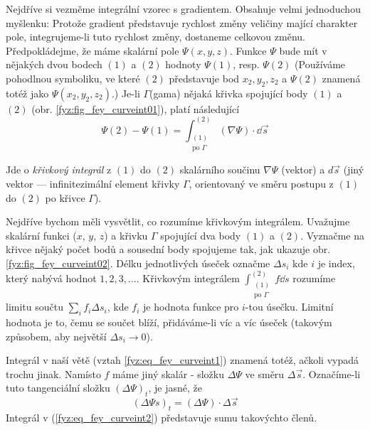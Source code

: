     Nejdříve si vezměme integrální vzorec s gradientem. Obsahuje velmi jednoduchou myšlenku: Protože 
    gradient představuje rychlost změny veličiny mající charakter pole, integrujeme-li tuto rychlost 
    změny, dostaneme celkovou změnu. Předpokládejme, že máme skalární pole \(\Psi(x, y, z)\). Funkce 
    \(\Psi\) bude mít v nějakých dvou bodech \((1)\) a \((2)\) hodnoty \(\Psi(1)\), resp. 
    \(\Psi(2)\) (Používáme pohodlnou symboliku, ve které \((2)\) představuje bod \(x_2, y_2, z_2\) a 
    \(\Psi(2)\) znamená totéž jako \(\Psi(x_2, y_2, z_2)\).) Je-li \(\Gamma\)(gama) nějaká křivka 
    spojující body \((1)\) a \((2)\) (obr. \ref{fyz:fig_fey_curveint01}), platí následující
    \begin{equation}\label{fyz:eq_fey_curveint1}
      \Psi(2)-\Psi(1) = \int_{\substack{(1)\\\text{po }\Gamma}}^{(2)}(\nabla\Psi)\cdot\dd{\vec{s}}
    \end{equation} 
    
    Jde o \emph{křivkový integrál} z \((1)\) do \((2)\) skalárního součinu \(\nabla\Psi\) (vektor) a
    \(d\vec{s}\) (jiný vektor — infinitezimální element křivky \(\Gamma\), orientovaný ve směru  
    postupu z \((1)\) do \((2)\) po křivce \(\Gamma\)).
    
    Nejdříve bychom měli vysvětlit, co rozumíme křivkovým integrálem. Uvažujme skalární funkci 
    (\(x\), \(y\), \(z\)) a křivku \(\Gamma\) spojující dva body \((1)\) a \((2)\). Vyznačme na 
    křivce nějaký počet bodů a sousední body spojujeme tak, jak ukazuje obr. 
    \ref{fyz:fig_fey_curveint02}. Délku jednotlivých úseček označme \(\Delta s_i\) kde \(i\) je 
    index, který nabývá hodnot \(1,2,3,\ldots\). Křivkovým integrálem   
    \(\displaystyle\int_{\substack{(1)\\\text{po }\Gamma}}^{(2)}f\dd{s}\) rozumíme limitu součtu 
    \(\displaystyle\sum_i f_i\Delta s_i\), kde \(f_i\) je hodnota funkce pro \(i\)-tou úsečku. 
    Limitní hodnota je to, čemu se součet blíží, přidáváme-li víc a víc úseček (takovým způsobem, 
    aby největší \(\Delta s_i\rightarrow 0\)).
    
    Integrál v naší větě (vztah \ref{fyz:eq_fey_curveint1}) znamená totéž, ačkoli vypadá trochu 
    jinak. Namísto \(f\) máme jiný skalár - složku \(\Delta\Psi\) ve směru \(\Delta\vec{s}\). 
    Označíme-li tuto tangenciální složku \((\Delta\Psi)_t\), je jasné, že
    \begin{equation}\label{fyz:eq_fey_curveint2}
      (\Delta\Psi s)_t = (\Delta\Psi)\cdot\Delta\vec{s}
    \end{equation}
    Integrál v (\ref{fyz:eq_fey_curveint2}) představuje sumu takovýchto členů.
    
